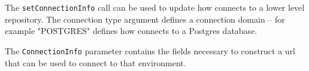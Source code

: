 The \verb+setConnectionInfo+ call can be used to update how \Rapture connects to a lower level repository. The connection type
argument defines a connection domain -- for example "POSTGRES" defines how \Rapture connects to a Postgres database.

The \verb+ConnectionInfo+ parameter contains the fields necessary to construct a url that can be used to connect to that environment.

